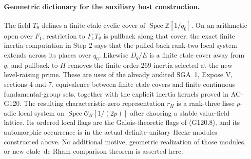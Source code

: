 \paragraph{Geometric dictionary for the auxiliary host construction.}
The field $T_\theta$ defines a finite etale cyclic cover of
$\operatorname{Spec}\mathbb Z[1/q_0]$.
On an arithmetic open over $F_1$, restriction to $F_1T_\theta$
is pullback along that cover; the exact finite inertia computation
in Step 2 says that the pulled-back rank-two local system extends
across its places over $q_0$.
Likewise $D_q/E$ is a finite etale cover away from $q$, and
pullback to $H$ removes the finite order-$269$ inertia selected
at the new level-raising prime.
These are uses of the already audited SGA~1, Expose V,
sections 4 and 7, equivalence between finite etale covers and
finite continuous fundamental-group sets, together with the
explicit inertia kernels proved in AC-G120.
The resulting characteristic-zero representation $r_H$ is a
rank-three lisse $p$-adic local system on
$\operatorname{Spec}\mathcal O_H[1/(2p)]$ after choosing a
stable value-field lattice.  Its ordered local flags are the
Galois-theoretic flags of (G120.8), and its automorphic occurrence
is in the actual definite-unitary Hecke modules constructed above.
No additional motive, geometric realization of those modules,
or new etale--de Rham comparison theorem is asserted here.
